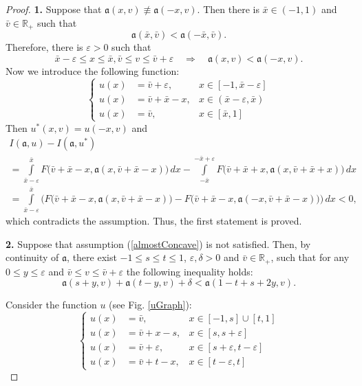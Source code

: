 \documentclass[12pt]{article}
\newcommand{\Real}{\mathbb R}
\newcommand{\eps}{\varepsilon}
\renewcommand{\le}{\leqslant}
\begin{document}
\begin{proof}
{\bf 1.} Suppose that $\mathfrak a(x, v) \not \equiv \mathfrak a(-x, v)$.
Then there is $\bar{x} \in (-1, 1 )$ and $\bar{v} \in \Real_+$ such that
$$\mathfrak a(\bar{x}, \bar{v}) < \mathfrak a(-\bar{x}, \bar{v}).$$
Therefore, there is $\eps> 0$ such that
$$\bar{x} - \eps \le x \le \bar{x}, \bar{v} \le v \le \bar{v} + \eps \quad \Longrightarrow \quad \mathfrak a(x, v) < \mathfrak a(-x, v).$$
Now we introduce the following function:
$$
\left\{     
\begin{aligned}
u(x) &= \bar{v} + \eps, & x \in [-1,\bar{x}-\eps]\\
u(x) &= \bar{v} + \bar{x} - x, & x \in (\bar{x} - \eps, \bar{x})\\
u(x) &= \bar{v}, & x \in [\bar{x}, 1]
\end{aligned}
\right.
$$
Then $u^*(x, v) = u(-x, v)$ and
\begin{multline*}
I(\mathfrak a, u)-I(\mathfrak a, u^*) \\
= \int\limits_{\bar{x}-\eps}^{\bar{x}} F\big( \bar{v} + \bar{x} - x, \mathfrak a(x, \bar{v} + \bar{x} - x) \big) \, dx -
\int\limits_{-\bar{x}}^{-\bar{x}+\eps} F\big( \bar{v} + \bar{x} + x, \mathfrak a(x, \bar{v} + \bar{x} + x) \big) \, dx \\
= \int\limits_{\bar{x}-\eps}^{\bar{x}} \big( F\big( \bar{v} + \bar{x} - x, \mathfrak a(x, \bar{v} + \bar{x} - x) \big) -
F\big( \bar{v} + \bar{x} - x, \mathfrak a(-x, \bar{v} + \bar{x} - x) \big) \big) \, dx < 0,
\end{multline*}
which contradicts the assumption. Thus, the first statement is proved.

{\bf 2.} Suppose that assumption (\ref{almostConcave}) is not satisfied.
Then, by continuity of $\mathfrak a$, there exist $-1 \le s \le t \le 1$, $\eps, \delta> 0$ and $\bar{v} \in \Real_+$, such that
for any $0 \le y \le \eps$ and $\bar{v} \le v \le \bar{v} + \eps$ the following inequality holds:
$$\mathfrak a(s + y, v) + \mathfrak a(t - y, v) + \delta < \mathfrak a( 1 - t + s + 2y, v).$$

Consider the function $u$ (see Fig. \ref{uGraph}):
\begin{equation}
\label{parLinU}
\left\{     
\begin{aligned}
u(x) &= \bar{v}, & x \in [-1, s] \cup [t, 1]\\
u(x) &= \bar{v} + x - s, & x \in [s, s + \eps]\\
u(x) &= \bar{v} + \eps, & x \in [s + \eps, t - \eps]\\
u(x) &= \bar{v} + t - x, & x \in [t - \eps, t]
\end{aligned}
\right.
\end{equation}


\end{proof}
\end{document}
